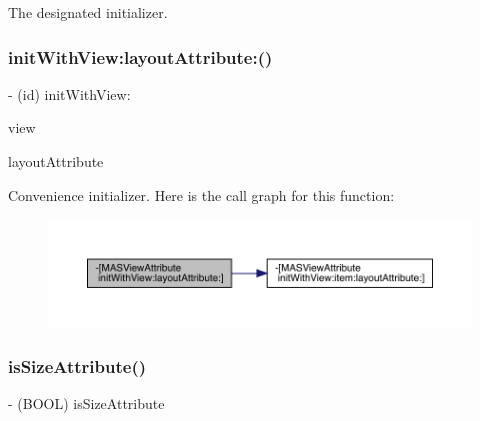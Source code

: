 The designated initializer. \mbox{\label{interface_m_a_s_view_attribute_ad8c7fbb0e68f781ffd498acd8618bece}} 
\subsubsection{\texorpdfstring{init\+With\+View\+:layout\+Attribute\+:()}{initWithView:layoutAttribute:()}}
{\footnotesize\ttfamily -\/ (id) init\+With\+View\+: \begin{DoxyParamCaption}\item[{(M\+A\+S\+\_\+\+V\+I\+EW $\ast$)}]{view }\item[{layoutAttribute:(N\+S\+Layout\+Attribute)}]{layout\+Attribute }\end{DoxyParamCaption}}

Convenience initializer. Here is the call graph for this function\+:\nopagebreak
\begin{figure}[H]
\begin{center}
\leavevmode
\includegraphics[width=350pt]{interface_m_a_s_view_attribute_ad8c7fbb0e68f781ffd498acd8618bece_cgraph}
\end{center}
\end{figure}
\mbox{\label{interface_m_a_s_view_attribute_aef0254d02a5de6de517372e56453bc69}} 
\subsubsection{\texorpdfstring{is\+Size\+Attribute()}{isSizeAttribute()}}
{\footnotesize\ttfamily -\/ (B\+O\+OL) is\+Size\+Attribute \begin{DoxyParamCaption}{ }\end{DoxyParamCaption}}

